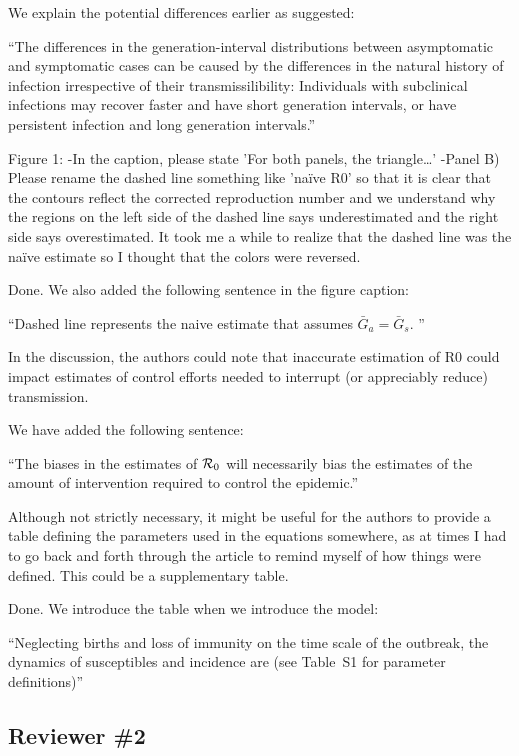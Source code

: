 \documentclass[12pt]{article}
\newcommand{\rev}{\subsection*}
\newcommand{\revtext}{\textsf}
\begin{document}
We explain the potential differences earlier as suggested:

``The differences in the generation-interval distributions between asymptomatic and symptomatic cases can be caused by the differences in the natural history of infection irrespective of their transmissilibility:
Individuals with subclinical infections may recover faster and have short generation intervals, or have persistent infection and long generation intervals.''

\revtext{Figure 1:
-In the caption, please state 'For both panels, the triangle…'
-Panel B) Please rename the dashed line something like 'naïve R0' so that it is clear that the contours reflect the corrected reproduction number and we understand why the regions on the left side of the dashed line says underestimated and the right side says overestimated.  It took me a while to realize that the dashed line was the naïve estimate so I thought that the colors were reversed.}

Done. We also added the following sentence in the figure caption:

``Dashed line represents the naive estimate that assumes $\bar G_a = \bar G_s$. ''

\revtext{In the discussion, the authors could note that inaccurate estimation of R0 could impact estimates of control efforts needed to interrupt (or appreciably reduce) transmission.}

We have added the following sentence:

``The biases in the estimates of ${\cal{R}}_0$ will necessarily bias the estimates of the amount of intervention required to control the epidemic.''

\revtext{Although not strictly necessary, it might be useful for the authors to provide a table defining the parameters used in the equations somewhere, as at times I had to go back and forth through the article to remind myself of how things were defined.  This could be a supplementary table.}

Done. We introduce the table when we introduce the model:

``Neglecting births and loss of immunity on the time scale of the outbreak, the dynamics of susceptibles and incidence are (see Table~S1 for parameter definitions)''

\rev{Reviewer \#2} 
\end{document}

